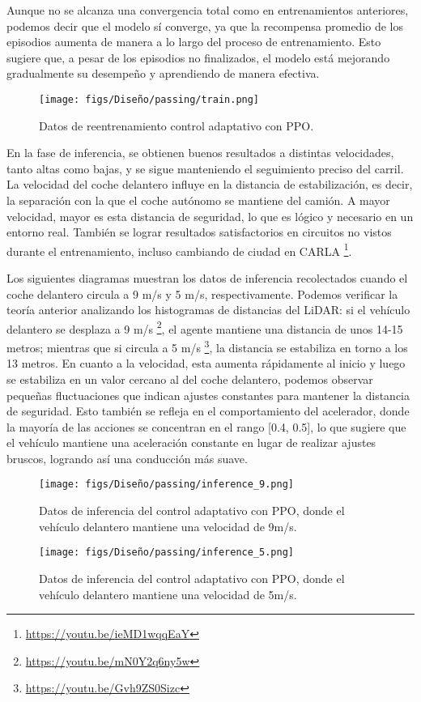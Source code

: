 \newpage

Aunque no se alcanza una convergencia total como en entrenamientos anteriores, podemos decir que el modelo sí converge, ya que la recompensa promedio de los episodios aumenta de manera a lo largo del proceso de entrenamiento. Esto sugiere que, a pesar de los episodios no finalizados, el modelo está mejorando gradualmente su desempeño y aprendiendo de manera efectiva. 
\begin{figure}[ht]
  \centering
  \texttt{[image: figs/Diseño/passing/train.png]}
  \caption{Datos de reentrenamiento control adaptativo con \ac{PPO}.}
  \label{fig:velocities}
\end{figure}

En la fase de inferencia, se obtienen buenos resultados a distintas velocidades, tanto altas como bajas, y se sigue manteniendo el seguimiento preciso del carril. La velocidad del coche delantero influye en la distancia de estabilización, es decir, la separación con la que el coche autónomo se mantiene del camión. A mayor velocidad, mayor es esta distancia de seguridad, lo que es lógico y necesario en un entorno real. También se lograr resultados satisfactorios en circuitos no vistos durante el entrenamiento, incluso cambiando de ciudad en CARLA \footnote{\url{https://youtu.be/ieMD1wqqEaY}}. 

Los siguientes diagramas muestran los datos de inferencia recolectados cuando el coche delantero circula a 9 m/s y 5 m/s, respectivamente. Podemos verificar la teoría anterior analizando los histogramas de distancias del \ac{LiDAR}: si el vehículo delantero se desplaza a 9 m/s \footnote{\url{https://youtu.be/mN0Y2q6ny5w}}, el agente mantiene una distancia de unos 14-15 metros; mientras que si circula a 5 m/s \footnote{\url{https://youtu.be/Gvh9ZS0Sizc}}, la distancia se estabiliza en torno a los 13 metros. En cuanto a la velocidad, esta aumenta rápidamente al inicio y luego se estabiliza en un valor cercano al del coche delantero, podemos observar pequeñas fluctuaciones que indican ajustes constantes para mantener la distancia de seguridad. Esto también se refleja en el comportamiento del acelerador, donde la mayoría de las acciones se concentran en el rango [0.4, 0.5], lo que sugiere que el vehículo mantiene una aceleración constante en lugar de realizar ajustes bruscos, logrando así una conducción más suave.

\begin{figure}[ht]
  \centering
  \texttt{[image: figs/Diseño/passing/inference\_9.png]}
  \caption{Datos de inferencia del control adaptativo con \ac{PPO}, donde el vehículo delantero mantiene una velocidad de 9m/s.}
  \label{fig:infrence_passing}
\end{figure}
\begin{figure}[ht]
  \centering
  \texttt{[image: figs/Diseño/passing/inference\_5.png]}
  \caption{Datos de inferencia del control adaptativo con \ac{PPO}, donde el vehículo delantero mantiene una velocidad de 5m/s.}
  \label{fig:infrence_passing}
\end{figure}

